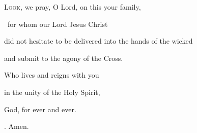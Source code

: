 \lettrine[loversize=0.15,lines=2]{L}{ook,} we pray, O Lord, on this your family,\par
~for whom our Lord Jesus Christ\par
\noindent did not hesitate to be delivered into the hands of the wicked\par
\noindent and submit to the agony of the Cross.\par
\noindent Who lives and reigns with you\par
\noindent in the unity of the Holy Spirit,\par
\noindent God, for ever and ever. 
\par \noindent \Rbar. Amen.
